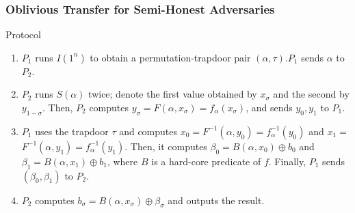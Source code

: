 \documentclass{beamer}
\begin{document}
    \begin{frame}
        \frametitle{Oblivious Transfer for Semi-Honest Adversaries}
        \begin{block}{Protocol}
            \begin{enumerate}
                \item $P_{1}$ runs $I\left(1^{n}\right)$ to obtain a permutation-trapdoor pair $(\alpha, \tau) . P_{1}$ sends $\alpha$ to $P_{2}$.
                \item $P_{2}$ runs $S(\alpha)$ twice; denote the first value obtained by $x_{\sigma}$ and the second by $y_{1-\sigma}$. Then, $P_{2}$ computes $y_{\sigma}=F\left(\alpha, x_{\sigma}\right)=f_{\alpha}\left(x_{\sigma}\right)$, and sends $y_{0}, y_{1}$ to $P_{1}$.
                \item $P_{1}$ uses the trapdoor $\tau$ and computes $x_{0}=F^{-1}\left(\alpha, y_{0}\right)=f_{\alpha}^{-1}\left(y_{0}\right)$ and $x_{1}=$ $F^{-1}\left(\alpha, y_{1}\right)=f_{\alpha}^{-1}\left(y_{1}\right) .$ Then, it computes $\beta_{0}=B\left(\alpha, x_{0}\right) \oplus b_{0}$ and $\beta_{1}=B\left(\alpha, x_{1}\right) \oplus b_{1}$,
                where $B$ is a hard-core predicate of $f$. Finally, $P_{1}$ sends $\left(\beta_{0}, \beta_{1}\right)$ to $P_{2}$.
                \item $P_{2}$ computes $b_{\sigma}=B\left(\alpha, x_{\sigma}\right) \oplus \beta_{\sigma}$ and outputs the result.
            \end{enumerate}
            
        \end{block}
  
    \end{frame}
\end{document}
